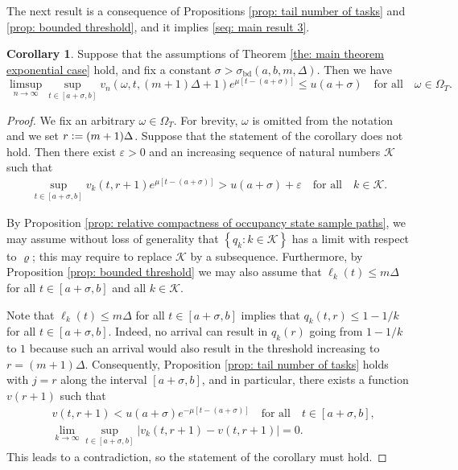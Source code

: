 \documentclass[a4paper, 12pt]{article}
\theoremstyle{definition}
\newtheorem{corollary}[theorem]{Corollary}
\newcommand{\set}[2]{\left\{#1 : #2\right\}}
\newcommand{\defeq}{\vcentcolon=}
\newcommand{\calK}{\mathcal{K}}
\newcommand{\bd}{\mathrm{bd}}
\begin{document}
The next result is a consequence of Propositions \ref{prop: tail number of tasks} and \ref{prop: bounded threshold}, and it implies \eqref{seq: main result 3}.

\begin{corollary}
	\label{cor: decay of the tail}
	Suppose that the assumptions of Theorem \ref{the: main theorem exponential case} hold, and fix a constant $\sigma > \sigma_\bd(a, b, m, \Delta)$. Then we have
	\begin{equation*}
		\limsup_{n \to \infty} \sup_{t \in [a + \sigma, b]} v_n(\omega, t, (m + 1)\Delta + 1)e^{\mu\left[t - (a + \sigma)\right]} \leq u(a + \sigma) \quad \text{for all} \quad \omega \in \Omega_T.
	\end{equation*}
\end{corollary}

\begin{proof}
We fix an arbitrary $\omega \in \Omega_T$. For brevity, $\omega$ is omitted from the notation and we set $r \defeq (m + 1) \Delta$. Suppose that the statement of the corollary does not hold. Then there exist $\varepsilon > 0$ and an increasing sequence of natural numbers $\calK$ such that
\begin{align*}
	\sup_{t \in [a + \sigma, b]} v_k(t, r + 1)e^{\mu\left[t - (a + \sigma)\right]} > u(a + \sigma) + \varepsilon \quad \text{for all} \quad k \in \calK.
\end{align*}

By Proposition \ref{prop: relative compactness of occupancy state sample paths}, we may assume without loss of generality that $\set{q_k}{k \in \calK}$ has a limit with respect to $\varrho$; this may require to replace $\calK$ by a subsequence. Furthermore, by Proposition \ref{prop: bounded threshold} we may also assume that $\ell_k(t) \leq m\Delta$ for all $t \in [a + \sigma, b]$ and all $k \in \calK$.

Note that $\ell_k(t) \leq m \Delta$ for all $t \in [a + \sigma, b]$ implies that $q_k(t, r) \leq 1 - 1 / k$ for all $t \in [a + \sigma, b]$. Indeed, no arrival can result in $q_k(r)$ going from $1 - 1 / k$ to $1$ because such an arrival would also result in the threshold increasing to $r = (m + 1) \Delta$. Consequently, Proposition \ref{prop: tail number of tasks} holds with $j = r$ along the interval $[a + \sigma, b]$, and in particular, there exists a function $v(r + 1)$ such that
\begin{align*}
	&v(t, r + 1) < u(a + \sigma)e^{-\mu\left[t - (a + \sigma)\right]} \quad \text{for all} \quad t \in [a + \sigma, b], \\
	&\lim_{k \to \infty} \sup_{t \in [a + \sigma, b]} \left|v_k(t, r + 1) - v(t, r + 1)\right| = 0.
\end{align*}
This leads to a contradiction, so the statement of the corollary must hold.
%
\end{proof}
\end{document}
